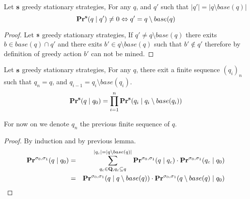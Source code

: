 \begin{mylem}
	\label{lem3}
	Let $\mathbf{s}$ greedy stationary strategies,
	For any $q$, and $q'$ such that $|q'| = |q \setminus base(q)|$
	$$\mathbf{Pr}^{\mathbf{s}}(q \mid q') \neq 0 \Leftrightarrow q' = q \setminus base(q)$$
\end{mylem}
\begin{proof}
	Let $\mathbf{s}$ greedy stationary strategies, If $q' \neq q \setminus base(q)$ there exits $b \in base(q) \cap q'$ and there exits $b' \in q \setminus base(q)$ such that $b' \notin q'$ therefore by definition of greedy action $b'$ can not be mined.
\end{proof}

\begin{mylem}
	Let $\mathbf{s}$ greedy stationary strategies,
	For any $q$, there exit a finite sequence $(q_i)_{n}$ such that $q_n = q$, and $q_{i-1} = q_i \setminus base(q_i)$.
	$$\mathbf{Pr}^{\mathbf{s}}(q \mid q_0) = \prod_{i = 1}^{n}\mathbf{Pr}^{\mathbf{s}}(q_i \mid q_{i} \setminus base(q_{i}))$$
\end{mylem}
For now on we denote $q_n$ the previous finite sequence of $q$.
\begin{proof}
	By induction and by previous lemma.
\begin{eqnarray*}
	\mathbf{Pr}^{\sigma_0,\sigma_1}(q \mid q_0) & = & \sum_{q_c \in \mathbf{Q}, q_c \subseteq q}^{|q_c| = |q \setminus base(q)|} \mathbf{Pr}^{\sigma_0,\sigma_1}(q \mid q_c) \cdot  	\mathbf{Pr}^{\sigma_0,\sigma_1}(q_c \mid q_0)	\\
	&=& \mathbf{Pr}^{\sigma_0,\sigma_1}(q \mid q \setminus base(q)) \cdot \mathbf{Pr}^{\sigma_0,\sigma_1}(q \setminus base(q) \mid q_0) \\
\end{eqnarray*}

\end{proof}

